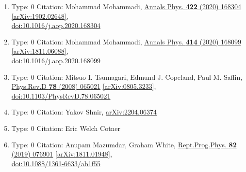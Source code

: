 \documentclass[a4paper,10pt]{article}
\begin{document}
\begin{enumerate}
\begin{enumerate}
  \item Type: 0 Citation: Mohammad Mohammadi, \href{https://www.doi.org/10.1016/j.aop.2020.168304}{Annals Phys. {\bf 422} (2020) 168304}  \href{https://arxiv.org/abs/1902.02648}{[arXiv:1902.02648]},\\\href{https://www.doi.org/10.1016/j.aop.2020.168304}{doi:10.1016/j.aop.2020.168304}
  \item Type: 0 Citation: Mohammad Mohammadi, \href{https://www.doi.org/10.1016/j.aop.2020.168099}{Annals Phys. {\bf 414} (2020) 168099}  \href{https://arxiv.org/abs/1811.06088}{[arXiv:1811.06088]},\\\href{https://www.doi.org/10.1016/j.aop.2020.168099}{doi:10.1016/j.aop.2020.168099}
  \item Type: 0 Citation: Mitsuo I. Tsumagari, Edmund J. Copeland, Paul M. Saffin, \href{https://www.doi.org/10.1103/PhysRevD.78.065021}{Phys.Rev.D {\bf 78} (2008) 065021}  \href{https://arxiv.org/abs/0805.3233}{[arXiv:0805.3233]},\\\href{https://www.doi.org/10.1103/PhysRevD.78.065021}{doi:10.1103/PhysRevD.78.065021}
  \item Type: 0 Citation: Yakov Shnir, \href{https://arxiv.org/abs/2204.06374}{arXiv:2204.06374}
  \item Type: 0 Citation: Eric Welch Cotner
  \item Type: 0 Citation: Anupam Mazumdar, Graham White, \href{https://www.doi.org/10.1088/1361-6633/ab1f55}{Rept.Prog.Phys. {\bf 82} (2019) 076901}  \href{https://arxiv.org/abs/1811.01948}{[arXiv:1811.01948]},\\\href{https://www.doi.org/10.1088/1361-6633/ab1f55}{doi:10.1088/1361-6633/ab1f55}

\end{enumerate}
\end{enumerate}
\end{document}
